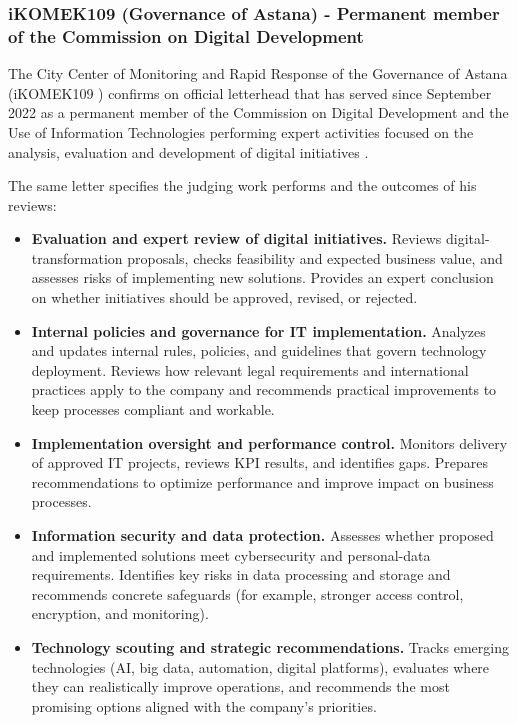 \subsubsection{iKOMEK109 (Governance of Astana) - Permanent member of the Commission on Digital Development}

\label{subsubsec:JudgingIKomek}

The City Center of Monitoring and Rapid Response of the Governance of Astana (iKOMEK109 ) confirms on official letterhead that \mrl{} has served since September 2022 as a permanent member of the Commission on Digital Development and the Use of Information Technologies performing expert activities focused on the analysis, evaluation and development of digital initiatives .

The same letter specifies the judging work \mrl{} performs and the outcomes of his reviews:
\vspace{-1\baselineskip}
\begin{itemize}[nosep]
\item \textbf{Evaluation and expert review of digital initiatives.} Reviews digital-transformation proposals, checks feasibility and expected business value, and assesses risks of implementing new solutions. Provides an expert conclusion on whether initiatives should be approved, revised, or rejected.
\item \textbf{Internal policies and governance for IT implementation.} Analyzes and updates internal rules, policies, and guidelines that govern technology deployment. Reviews how relevant legal requirements and international practices apply to the company and recommends practical improvements to keep processes compliant and workable.
\item \textbf{Implementation oversight and performance control.} Monitors delivery of approved IT projects, reviews KPI results, and identifies gaps. Prepares recommendations to optimize performance and improve impact on business processes.
\item \textbf{Information security and data protection.} Assesses whether proposed and implemented solutions meet cybersecurity and personal-data requirements. Identifies key risks in data processing and storage and recommends concrete safeguards (for example, stronger access control, encryption, and monitoring).
\item \textbf{Technology scouting and strategic recommendations.} Tracks emerging technologies (AI, big data, automation, digital platforms), evaluates where they can realistically improve operations, and recommends the most promising options aligned with the company’s priorities.
\end{itemize}

